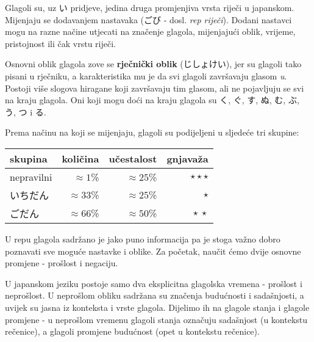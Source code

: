 	
	
	Glagoli su, uz い pridjeve, jedina druga promjenjiva vrsta riječi u japanskom. Mijenjaju se dodavanjem nastavaka (ごび - dosl. \textit{rep riječi}). Dodani nastavci mogu na razne načine utjecati na značenje glagola, mijenjajući oblik, vrijeme, pristojnost ili čak vrstu riječi.
	
	Osnovni oblik glagola zove se \textbf{rječnički oblik} (じしょけい), jer su glagoli tako pisani u rječniku, a karakteristika mu je da svi glagoli završavaju glasom \textit{u}. Postoji više slogova hiragane koji završavaju tim glasom, ali ne pojavljuju se svi na kraju glagola. Oni koji mogu doći na kraju glagola su く, ぐ, す, ぬ, む, ぶ, う, つ i る.
	
	Prema načinu na koji se mijenjaju, glagoli su podijeljeni u sljedeće tri skupine:
	
	\begin{table}[h]
		\centering
		\begin{tabular}{l r r r}\toprule[2pt]
			skupina & količina & učestalost & gnjavaža\\
			\midrule
			nepravilni & $\approx 1$\% & $\approx 25$\% & $\star\star\star$\\
			いちだん\footnotemark[1] & $\approx 33$\% & $\approx 25$\% & $\star$\\
			ごだん\footnotemark[1] & $\approx 66$\% & $\approx 50$\% & $\star\:\star$\\
			\bottomrule[2pt]
		\end{tabular}
	\end{table}


	U repu glagola sadržano je jako puno informacija pa je stoga važno dobro poznavati sve moguće nastavke i oblike. Za početak, naučit ćemo dvije osnovne promjene - prošlost i negaciju.
	
	
	U japanskom jeziku postoje samo dva eksplicitna glagolska vremena - prošlost i neprošlost. U neprošlom obliku sadržana su značenja budućnosti i sadašnjosti, a uvijek su jasna iz konteksta i vrste glagola. Dijelimo ih na glagole stanja i glagole promjene - u neprošlom vremenu glagoli stanja označuju sadašnjost (u kontekstu rečenice), a glagoli promjene budućnost (opet u kontekstu rečenice).
	
